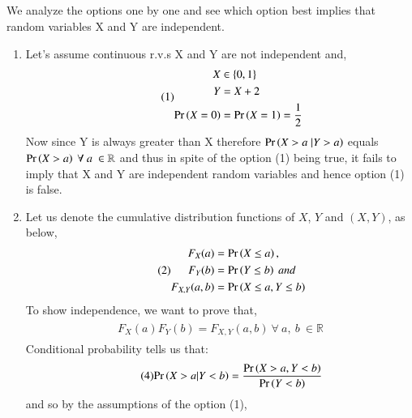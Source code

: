 \documentclass[journal,12pt,twocolumn]{IEEEtran}
\begin{document}
\subsection*{}
We analyze the options one by one and see which option best implies that random variables X and Y are independent. \\
\begin{enumerate}
    \item Let's assume continuous r.v.s X and Y are not independent and, \\
\begin{align}\tag{1}
    \begin{split}
        X &\in \{0, 1\}\\
        Y &= X + 2\\
        \Pr\left(X=0\right) &= \Pr\left(X=1\right) = \dfrac{1}{2}\\
    \end{split}
\end{align}
Now since Y is always greater than X therefore $\Pr\left(X>a \;| Y>a\right)$ equals $\Pr\left(X > a\right)\ \forall\ a\ \in \mathbb{R}$ and thus in spite of the option (1) being true, it fails to imply that X and Y are independent random variables and hence option (1) is false.\\
    \item Let us denote the cumulative distribution functions of $X$, $Y$ and $(X, Y)$, as below,\\
\begin{align}\tag{2}
    \begin{split}
        F_X(a) &= \Pr\left(X \leq a\right),\\
        F_Y(b) &= \Pr\left(Y \leq b\right)\ and \\
        F_{X,Y}(a,b) &= \Pr\left(X \leq a, Y \leq b\right)
    \end{split}
\end{align}
To show independence, we want to prove that,
\begin{align}\tag{3}
    \begin{split}
        F_X(a)F_Y(b) = F_{X, Y}(a,b)\ \forall\ a,\ b\ \in \mathbb{R}
    \end{split}
\end{align}
Conditional probability tells us that: 
\begin{align}\tag{4}
    \begin{split}
        \Pr\left(X > a | Y < b\right) = \frac{\Pr\left(X > a, Y < b\right)}{\Pr\left(Y < b\right)}
    \end{split}
\end{align}
and so by the assumptions of the option (1),

\end{enumerate}
\end{document}
